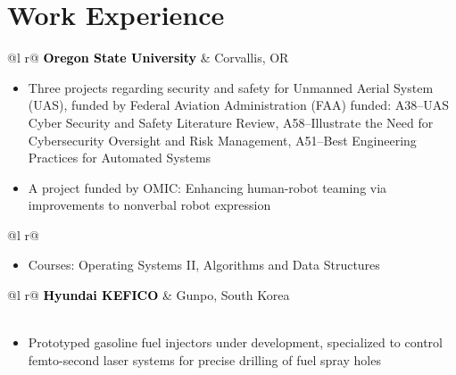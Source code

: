 \documentclass[letterpaper,10pt]{article}
\begin{document}
{\selectfont
\section{Work Experience}
}
\vspace{-2mm}
\begin{tabularx}{\linewidth}{ @{}l r@{} }
\textcolor{Black}{\textbf{Oregon State University}} & \hfill Corvallis, OR \\[2pt]
\end{tabularx}
\vspace{-1em}
\begin{itemize}[nosep,after=\strut, leftmargin=1em, itemsep=1pt, topsep=0pt]
    \item Three projects regarding security and safety for Unmanned Aerial System (UAS), funded by Federal Aviation Administration (FAA) funded: A38--UAS Cyber Security and Safety Literature Review, A58--Illustrate the Need for Cybersecurity Oversight and Risk Management, A51--Best Engineering Practices for Automated Systems
    \item A project funded by OMIC: Enhancing human-robot teaming via improvements to nonverbal robot expression
\end{itemize}
\vspace{-3pt}
\begin{tabularx}{\linewidth}{ @{}l r@{} }
\\[2pt]
\end{tabularx}
\vspace{-2em}
\begin{itemize}[nosep,after=\strut, leftmargin=1em, itemsep=2pt]
    \item Courses: Operating Systems II, Algorithms and Data Structures
\end{itemize}

\vspace{-1.5mm}

\begin{tabularx}{\linewidth}{ @{}l r@{} }
\textcolor{Black}{\textbf{Hyundai KEFICO}} & \hfill Gunpo, South Korea \\[2pt]
\\[2pt]
\end{tabularx}
\vspace{-1em}
\begin{itemize}[nosep,after=\strut, leftmargin=1em, itemsep=2pt]
    \item Prototyped gasoline fuel injectors under development, specialized to control femto-second laser systems for precise drilling of fuel spray holes
\end{itemize}
\end{document}
